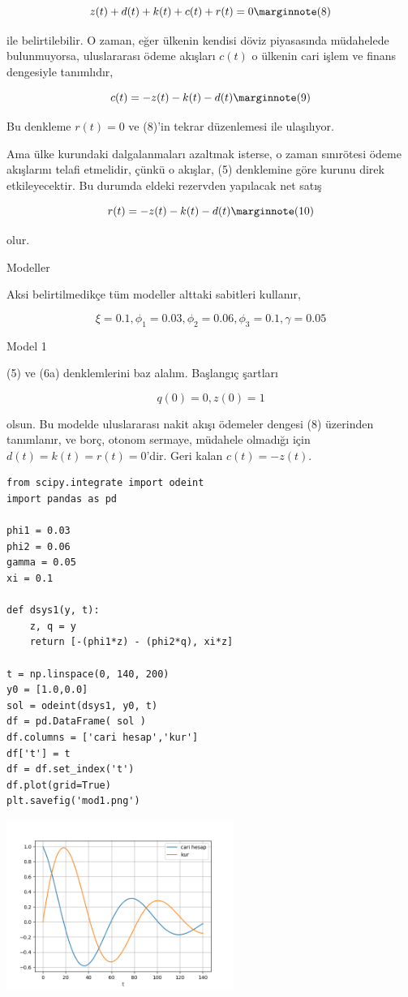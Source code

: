 \documentclass[12pt,fleqn]{article}\usepackage{../../common}
\begin{document}
$$
z(t) + d(t) + k(t) + c(t) + r(t) = 0 
\mlabel{8}
$$

ile belirtilebilir. O zaman, eğer ülkenin kendisi döviz piyasasında
müdahelede bulunmuyorsa, uluslararası ödeme akışları $c(t)$ o ülkenin cari
işlem ve finans dengesiyle tanımlıdır, 

$$
c(t) = -z(t) - k(t) - d(t)
\mlabel{9}
$$

Bu denkleme $r(t)=0$ ve (8)'in tekrar düzenlemesi ile ulaşılıyor. 

Ama ülke kurundaki dalgalanmaları azaltmak isterse, o zaman sınırötesi
ödeme akışlarını telafi etmelidir, çünkü o akışlar, (5) denklemine göre
kurunu direk etkileyecektir. Bu durumda eldeki rezervden yapılacak net
satış 

$$
r(t) = -z(t) -k(t) -d(t)
\mlabel{10}
$$

olur. 

Modeller

Aksi belirtilmedikçe tüm modeller alttaki sabitleri kullanır,

$$
\xi = 0.1, \phi_1 = 0.03, \phi_2 = 0.06, \phi_3 = 0.1, \gamma = 0.05
$$

Model 1

(5) ve (6a) denklemlerini baz alalım. Başlangıç şartları 

$$
q(0) = 0, z(0) = 1
$$

olsun. Bu modelde uluslararası nakit akışı ödemeler dengesi (8) üzerinden
tanımlanır, ve borç, otonom sermaye, müdahele olmadığı için
$d(t)=k(t)=r(t)=0$'dir. Geri kalan $c(t) = -z(t)$. 

\begin{verbatim}
from scipy.integrate import odeint
import pandas as pd

phi1 = 0.03
phi2 = 0.06
gamma = 0.05
xi = 0.1

def dsys1(y, t):
    z, q = y
    return [-(phi1*z) - (phi2*q), xi*z]

t = np.linspace(0, 140, 200)
y0 = [1.0,0.0]
sol = odeint(dsys1, y0, t)
df = pd.DataFrame( sol )
df.columns = ['cari hesap','kur']
df['t'] = t
df = df.set_index('t')
df.plot(grid=True)
plt.savefig('mod1.png')
\end{verbatim}

\includegraphics[width=20em]{mod1.png}
\end{document}
